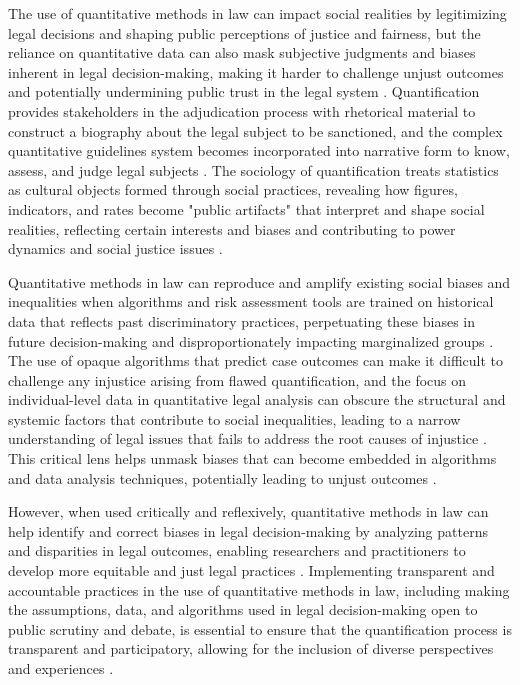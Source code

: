 The use of quantitative methods in law can impact social realities by legitimizing legal decisions and shaping public perceptions of justice and fairness, but the reliance on quantitative data can also mask subjective judgments and biases inherent in legal decision-making, making it harder to challenge unjust outcomes and potentially undermining public trust in the legal system \cite{10.5040/9781350220645,10.1080/07329113.2015.1046739}. Quantification provides stakeholders in the adjudication process with rhetorical material to construct a biography about the legal subject to be sanctioned, and the complex quantitative guidelines system becomes incorporated into narrative form to know, assess, and judge legal subjects \cite{101111lsi12334}. The sociology of quantification treats statistics as cultural objects formed through social practices, revealing how figures, indicators, and rates become "public artifacts" that interpret and shape social realities, reflecting certain interests and biases and contributing to power dynamics and social justice issues \cite{camargo2021,paiva2021}.

Quantitative methods in law can reproduce and amplify existing social biases and inequalities when algorithms and risk assessment tools are trained on historical data that reflects past discriminatory practices, perpetuating these biases in future decision-making and disproportionately impacting marginalized groups \cite{10.1590/dados.2022.65.3.267,10.3390/fi9040068}. The use of opaque algorithms that predict case outcomes can make it difficult to challenge any injustice arising from flawed quantification, and the focus on individual-level data in quantitative legal analysis can obscure the structural and systemic factors that contribute to social inequalities, leading to a narrow understanding of legal issues that fails to address the root causes of injustice \cite{10.1590/dados.2022.65.3.267,10.3390/fi9040068}. This critical lens helps unmask biases that can become embedded in algorithms and data analysis techniques, potentially leading to unjust outcomes \cite{10.1590/dados.2022.65.3.267,10.3390/fi9040068}.

However, when used critically and reflexively, quantitative methods in law can help identify and correct biases in legal decision-making by analyzing patterns and disparities in legal outcomes, enabling researchers and practitioners to develop more equitable and just legal practices \cite{10.1590/dados.2022.65.3.267,10.3390/fi9040068}. Implementing transparent and accountable practices in the use of quantitative methods in law, including making the assumptions, data, and algorithms used in legal decision-making open to public scrutiny and debate, is essential to ensure that the quantification process is transparent and participatory, allowing for the inclusion of diverse perspectives and experiences \cite{10.1590/dados.2022.65.3.267,10.3390/fi9040068,salais2016}.

